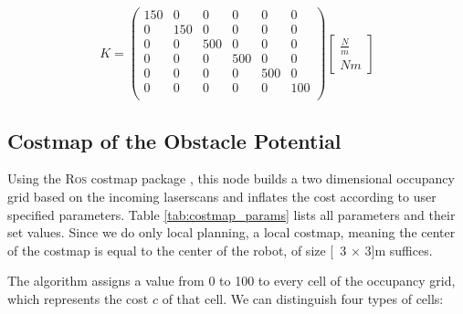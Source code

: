 \begin{equation}
K = \begin{pmatrix}
150 & 0 & 0 & 0 & 0 & 0 \\
0 & 150 & 0 & 0 & 0 & 0 \\
0 & 0 & 500 & 0 & 0 & 0 \\
0 & 0 & 0 & 500 & 0 & 0 \\
0 & 0 & 0 & 0 & 500 & 0 \\
0 & 0 & 0 & 0 & 0 & 100 \\
\end{pmatrix}
\begin{bmatrix}
\frac{N}{m} \\
N m
\end{bmatrix}
\label{eq:K}
\end{equation}

\subsection{Costmap of the Obstacle Potential}
	\label{sec:costmap}
	
Using the \textsc{Ros} costmap package \citep{rosCostmap}, this node builds a two dimensional occupancy grid based on the incoming laserscans and inflates the cost according to user specified parameters. Table \ref{tab:costmap_params} lists all parameters and their set values. Since we do only local planning, a local costmap, meaning the center of the costmap is equal to the center of the robot, of size \unit[3 $\times$ 3]{m} suffices.

The algorithm assigns a value from 0 to 100 to every cell of the occupancy grid, which represents the cost $c$ of that cell. We can distinguish four types of cells:

